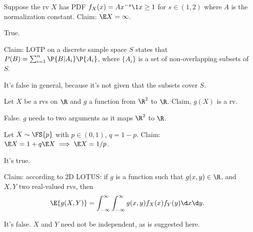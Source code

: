 \documentclass[tf-tutorial-all.tex]{subfiles}
\begin{document}
\begin{truefalse}
Suppose the rv $X$ has PDF $f_{X}(x) = Ax^{-s} \1{x\geq 1}$ for $s\in (1, 2)$ where $A$ is the normalization constant.
Claim: $\E X = \infty$.
\begin{solution}
True.
\end{solution}
\end{truefalse}

\begin{truefalse}
Claim: LOTP on a discrete sample space $S$ states that $P(B) = \sum_{i=1}^{n} \P{B|A_{i}} \P{A_{i}}$, where $\{A_{i}\}$ is a set of non-overlapping subsets of $S$.
\begin{solution}
It's false in general, because it's not given that the subsets cover $S$.
\end{solution}
\end{truefalse}


\begin{truefalse}
Let $X$ be a rvs on $\R$ and $g$ a function from $\R^{2}$ to $\R$.
Claim, $g(X)$ is a rv.
\begin{solution}
False. $g$ needs to two arguments as it maps $\R^{2}$ to $\R$.
\end{solution}
\end{truefalse}





\begin{truefalse}
Let $X\sim \FS{p}$ with $p\in (0, 1)$, $q=1-p$. Claim: $\E X = 1+q\E X \implies \E X = 1/p$.
\begin{solution}
It's true.
\end{solution}
\end{truefalse}


\begin{truefalse}
Claim: according to 2D LOTUS: if $g$ is a function such that $g(x, y) \in \R $, and $X, Y$ two real-valued rvs, then
\begin{equation}
\E{g(X,Y)} = \int_{-\infty}^{\infty} \int_{-\infty} ^{\infty} g(x,y) f_{X}(x)f_Y(y) \d x \d y.
\end{equation}
\begin{solution}
It's false. $X$ and $Y$ need not be independent, as is suggested here.
\end{solution}
\end{truefalse}
\end{document}
